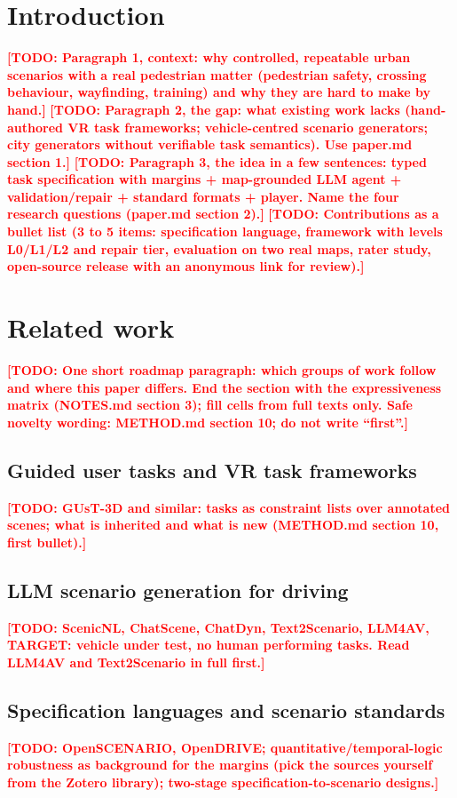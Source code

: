 \documentclass[preprint,12pt]{elsarticle}
\newcommand{\todo}[1]{\textcolor{red}{\textbf{[TODO: #1]}}}
\begin{document}
\section{Introduction}
\todo{Paragraph 1, context: why controlled, repeatable urban scenarios with a real pedestrian matter (pedestrian safety, crossing behaviour, wayfinding, training) and why they are hard to make by hand.}
\todo{Paragraph 2, the gap: what existing work lacks (hand-authored VR task frameworks; vehicle-centred scenario generators; city generators without verifiable task semantics). Use paper.md section 1.}
\todo{Paragraph 3, the idea in a few sentences: typed task specification with margins + map-grounded LLM agent + validation/repair + standard formats + player. Name the four research questions (paper.md section 2).}
\todo{Contributions as a bullet list (3 to 5 items: specification language, framework with levels L0/L1/L2 and repair tier, evaluation on two real maps, rater study, open-source release with an anonymous link for review).}

\section{Related work}
\todo{One short roadmap paragraph: which groups of work follow and where this paper differs. End the section with the expressiveness matrix (NOTES.md section 3); fill cells from full texts only. Safe novelty wording: METHOD.md section 10; do not write ``first''.}
\subsection{Guided user tasks and VR task frameworks}
\todo{GUsT-3D and similar: tasks as constraint lists over annotated scenes; what is inherited and what is new (METHOD.md section 10, first bullet).}
\subsection{LLM scenario generation for driving}
\todo{ScenicNL, ChatScene, ChatDyn, Text2Scenario, LLM4AV, TARGET: vehicle under test, no human performing tasks. Read LLM4AV and Text2Scenario in full first.}
\subsection{Specification languages and scenario standards}
\todo{OpenSCENARIO, OpenDRIVE; quantitative/temporal-logic robustness as background for the margins (pick the sources yourself from the Zotero library); two-stage specification-to-scenario designs.}
\end{document}
